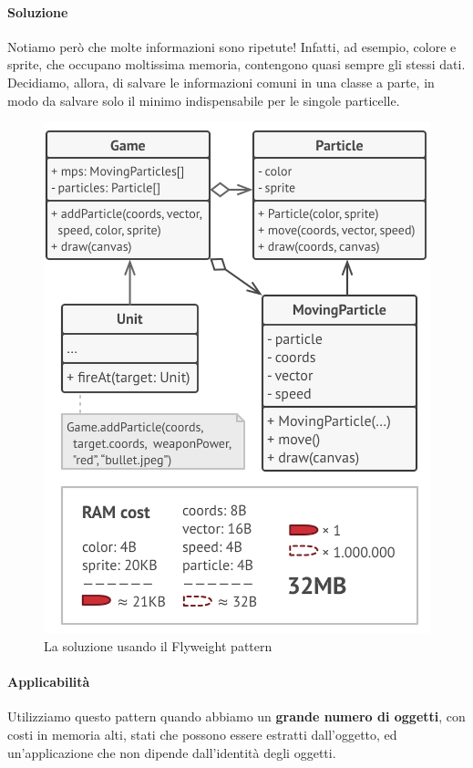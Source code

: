 \documentclass[11pt]{article}
\begin{document}
\paragraph{Soluzione}
Notiamo però che molte informazioni sono ripetute! Infatti, ad esempio, colore e sprite, che occupano moltissima memoria, contengono quasi sempre gli stessi dati. Decidiamo, allora, di salvare le informazioni comuni in una classe a parte, in modo da salvare solo il minimo indispensabile per le singole particelle. 
\begin{figure}[H]
    \includegraphics[width=\linewidth]{res/teoria/FlyweightSolution.png}
    \caption{La soluzione usando il Flyweight pattern}
\end{figure}
\paragraph{Applicabilità}
Utilizziamo questo pattern quando abbiamo un \textbf{grande numero di oggetti}, con costi in memoria alti, stati che possono essere estratti dall'oggetto, ed un'applicazione che non dipende dall'identità degli oggetti. 
\end{document}
